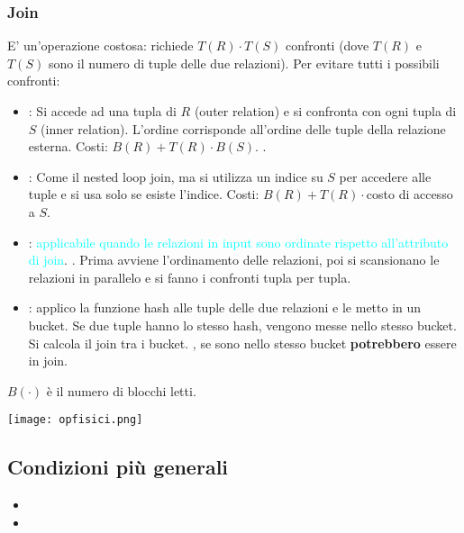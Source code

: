 \documentclass[12pt]{article}
\begin{document}
\subsubsection{Join}
E' un'operazione costosa: richiede $T(R)\cdot T(S)$ confronti (dove $T(R)$ e $T(S)$ sono il numero di tuple delle due relazioni). Per evitare tutti i possibili confronti:
\begin{itemize}
    \item {}: Si accede ad una tupla di $R$ (outer relation) e si confronta con ogni tupla di $S$ (inner relation). L'ordine corrisponde all'ordine delle tuple della relazione esterna. Costi: $B(R) + T(R) \cdot B(S)$. .
    \item {}: Come il nested loop join, ma si utilizza un indice su $S$ per accedere alle tuple e si usa solo se esiste l'indice. Costi: $B(R)+T(R) \cdot$costo di accesso a $S$.
    \item {}: \textcolor{Cyan}{ applicabile quando le relazioni in input sono ordinate rispetto all’attributo di join}. . Prima avviene l'ordinamento delle relazioni, poi si scansionano le relazioni in parallelo e si fanno i confronti tupla per tupla.
    \item {}: applico la funzione hash alle tuple delle due relazioni e le metto in un bucket. Se due tuple hanno lo stesso hash, vengono messe nello stesso bucket. Si calcola il join tra i bucket. , se sono nello stesso bucket \textbf{potrebbero} essere in join.
\end{itemize}
$B(\cdot)$ è il numero di blocchi letti.
\begin{center}
    \texttt{[image: opfisici.png]}
\end{center}
\subsection{Condizioni più generali}
\begin{itemize}
    \item {}
    \item {}
\end{itemize}
\end{document}
